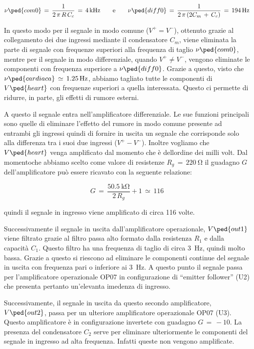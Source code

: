 \begin{equation}
	\nu\ped{com0}\,=\,\frac{1}{2\,\pi\,R\,C_c}\,=\,\SI{4}{\kilo\hertz} \qquad \text{e} \qquad \nu\ped{diff0}\,=\,\frac{1}{2\,\pi\,(2C_m\,+\,C_c)}\,=\,\SI{194}{\hertz}
\end{equation}

In questo modo per il segnale in modo comune ($V^+=V^-$), ottenuto grazie al collegamento dei due ingressi mediante il condensatore $C_m$, viene eliminata la parte di segnale con frequenze superiori alla frequenza di taglio $\nu\ped{com0}$, mentre per il segnale in modo differenziale, quando $V^+ \neq V^-$, vengono eliminate le componenti con frequenza superiore a $\nu\ped{diff0}$. Grazie a questo, visto che $\nu\ped{cardiaca}\,\simeq\,\SI{1.25}{\hertz}$, abbiamo tagliato tutte le componenti di $V\ped{heart}$ con frequenze superiori a quella interessata. Questo ci permette di ridurre, in parte, gli effetti di rumore esterni.

A questo il segnale entra nell'amplificatore differenziale. Le sue funzioni principali sono quelle di eliminare l'effetto del rumore in modo comune presente ad entrambi gli ingressi quindi di fornire in uscita un segnale che corrisponde solo alla differenza tra i suoi due ingressi ($V^+-V^-$). Inoltre vogliamo che $V\ped{heart}$ venga amplificato dal momento che è dellordine dei milli volt.
Dal momentoche abbiamo scelto come valore di resistenze $R_g\,=\,\SI{220}{\ohm}$ il guadagno $G$ dell'amplificatore può essere ricavato con la seguente relazione:

\begin{equation}
	G\,=\,\frac{\SI{50.5}{\kilo\ohm}}{2\,R_g} + 1 \,\simeq\,116 
\end{equation}

quindi il segnale in ingresso viene amplificato di circa 116 volte.

Successivamente il segnale in uscita dall'amplificatore operazionale, $V\ped{out1}$ viene filtrato grazie al filtro passa alto formato dalla resistenza $R_1$ e dalla capacità $C_1$. Questo filtro ha una frequenza di taglio di circa \SI{3}{\hertz}, quindi molto bassa. Grazie a questo si riescono ad eliminare le componenti continue del segnale in uscita con frequenza pari o inferiore ai \SI{3}{\hertz}.
A questo punto il segnale passa per l'amplificatore operazionale OP07 in configurazione di ``emitter follower'' (U2) che presenta pertanto un'elevanta imedenza di ingresso.

Successivamente, il segnale in uscita da questo secondo amplificatore, $V\ped{out2}$, passa per un ulteriore amplificatore operazionale OP07 (U3). Questo amplificatore è in configurazione invertete con guadagno $G\,=\,-10$. La presenza del condensatore $C_2$ serve per eliminare ulteriormente le componenti del segnale in ingresso ad alta frequenza. Infatti queste non vengono amplificate.

